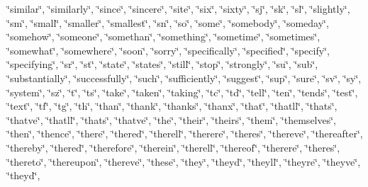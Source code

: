 \char`\"{}similar\char`\"{}, \char`\"{}similarly\char`\"{}, \char`\"{}since\char`\"{}, \char`\"{}sincere\char`\"{}, \char`\"{}site\char`\"{}, \char`\"{}six\char`\"{}, \char`\"{}sixty\char`\"{}, \char`\"{}sj\char`\"{}, \char`\"{}sk\char`\"{}, \char`\"{}sl\char`\"{}, \char`\"{}slightly\char`\"{}, \char`\"{}sm\char`\"{}, \char`\"{}small\char`\"{}, \char`\"{}smaller\char`\"{}, \char`\"{}smallest\char`\"{}, \char`\"{}sn\char`\"{}, \char`\"{}so\char`\"{}, \char`\"{}some\char`\"{}, \char`\"{}somebody\char`\"{}, \char`\"{}someday\char`\"{}, \char`\"{}somehow\char`\"{}, \char`\"{}someone\char`\"{}, \char`\"{}somethan\char`\"{}, \char`\"{}something\char`\"{}, \char`\"{}sometime\char`\"{}, \char`\"{}sometimes\char`\"{}, \char`\"{}somewhat\char`\"{}, \char`\"{}somewhere\char`\"{}, \char`\"{}soon\char`\"{}, \char`\"{}sorry\char`\"{}, \char`\"{}specifically\char`\"{}, \char`\"{}specified\char`\"{}, \char`\"{}specify\char`\"{}, \char`\"{}specifying\char`\"{}, \char`\"{}sr\char`\"{}, \char`\"{}st\char`\"{}, \char`\"{}state\char`\"{}, \char`\"{}states\char`\"{}, \char`\"{}still\char`\"{}, \char`\"{}stop\char`\"{}, \char`\"{}strongly\char`\"{}, \char`\"{}su\char`\"{}, \char`\"{}sub\char`\"{}, \char`\"{}substantially\char`\"{}, \char`\"{}successfully\char`\"{}, \char`\"{}such\char`\"{}, \char`\"{}sufficiently\char`\"{}, \char`\"{}suggest\char`\"{}, \char`\"{}sup\char`\"{}, \char`\"{}sure\char`\"{}, \char`\"{}sv\char`\"{}, \char`\"{}sy\char`\"{}, \char`\"{}system\char`\"{}, \char`\"{}sz\char`\"{}, \char`\"{}t\char`\"{}, \char`\"{}t\textquotesingle{}s\char`\"{}, \char`\"{}take\char`\"{}, \char`\"{}taken\char`\"{}, \char`\"{}taking\char`\"{}, \char`\"{}tc\char`\"{}, \char`\"{}td\char`\"{}, \char`\"{}tell\char`\"{}, \char`\"{}ten\char`\"{}, \char`\"{}tends\char`\"{}, \char`\"{}test\char`\"{}, \char`\"{}text\char`\"{}, \char`\"{}tf\char`\"{}, \char`\"{}tg\char`\"{}, \char`\"{}th\char`\"{}, \char`\"{}than\char`\"{}, \char`\"{}thank\char`\"{}, \char`\"{}thanks\char`\"{}, \char`\"{}thanx\char`\"{}, \char`\"{}that\char`\"{}, \char`\"{}that\textquotesingle{}ll\char`\"{}, \char`\"{}that\textquotesingle{}s\char`\"{}, \char`\"{}that\textquotesingle{}ve\char`\"{}, \char`\"{}thatll\char`\"{}, \char`\"{}thats\char`\"{}, \char`\"{}thatve\char`\"{}, \char`\"{}the\char`\"{}, \char`\"{}their\char`\"{}, \char`\"{}theirs\char`\"{}, \char`\"{}them\char`\"{}, \char`\"{}themselves\char`\"{}, \char`\"{}then\char`\"{}, \char`\"{}thence\char`\"{}, \char`\"{}there\char`\"{}, \char`\"{}there\textquotesingle{}d\char`\"{}, \char`\"{}there\textquotesingle{}ll\char`\"{}, \char`\"{}there\textquotesingle{}re\char`\"{}, \char`\"{}there\textquotesingle{}s\char`\"{}, \char`\"{}there\textquotesingle{}ve\char`\"{}, \char`\"{}thereafter\char`\"{}, \char`\"{}thereby\char`\"{}, \char`\"{}thered\char`\"{}, \char`\"{}therefore\char`\"{}, \char`\"{}therein\char`\"{}, \char`\"{}therell\char`\"{}, \char`\"{}thereof\char`\"{}, \char`\"{}therere\char`\"{}, \char`\"{}theres\char`\"{}, \char`\"{}thereto\char`\"{}, \char`\"{}thereupon\char`\"{}, \char`\"{}thereve\char`\"{}, \char`\"{}these\char`\"{}, \char`\"{}they\char`\"{}, \char`\"{}they\textquotesingle{}d\char`\"{}, \char`\"{}they\textquotesingle{}ll\char`\"{}, \char`\"{}they\textquotesingle{}re\char`\"{}, \char`\"{}they\textquotesingle{}ve\char`\"{}, \char`\"{}theyd\char`\"{}, 